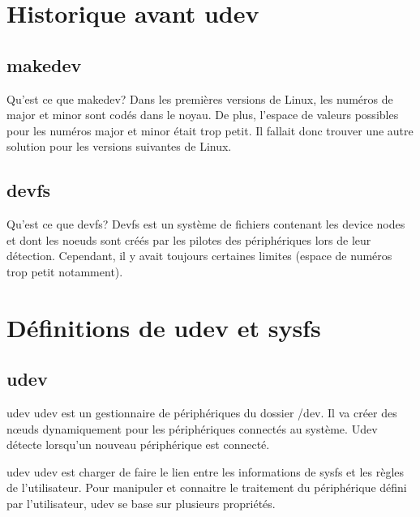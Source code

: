 \documentclass{beamer}
\begin{document}
\section{Historique avant udev}

\subsection{makedev}
\begin{frame}
\begin{block}{Qu'est ce que makedev?} 
	Dans les premières versions de Linux, les numéros de major et minor sont codés dans le noyau. De plus, l'espace de valeurs possibles pour les numéros major et minor était trop petit. 
	Il fallait donc trouver une autre solution pour les versions suivantes de Linux.
\end{block}
\end{frame}

\subsection{devfs}
\begin{frame}
\begin{block}{Qu'est ce que devfs?} 
	Devfs est un système de fichiers contenant les device nodes et dont les noeuds sont créés par les pilotes des périphériques lors de leur détection. Cependant, il y avait toujours certaines limites (espace de numéros trop petit notamment).
\end{block}
\end{frame}

\section{Définitions de udev et sysfs}

\subsection{udev}

\begin{frame}
\begin{block}{udev} 
	udev est un gestionnaire de périphériques du dossier /dev. Il va créer des nœuds dynamiquement pour les périphériques connectés au système. 
	Udev détecte lorsqu'un nouveau périphérique est connecté. 
\end{block}
\end{frame}

\begin{frame}
\begin{block}{udev}
	udev est charger de faire le lien entre les informations de sysfs et les règles de l'utilisateur.
	Pour manipuler et connaitre le traitement du périphérique défini par l'utilisateur, udev se base sur plusieurs propriétés.
	 
\end{block}
\end{frame}
\end{document}
